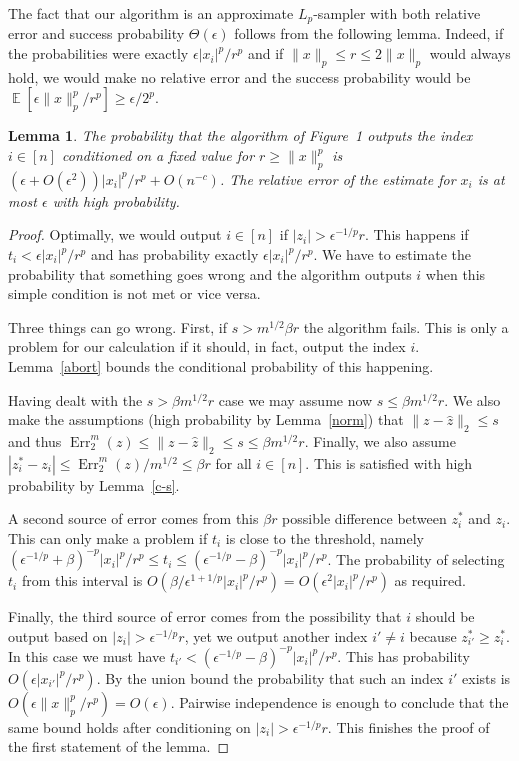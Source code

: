 \documentclass[9pt,letterpaper]{article}
\newtheorem{lemma}{Lemma}
\theoremstyle{remark}
\DeclareMathOperator*{\E}{\mathbb{E}}
\DeclareMathOperator{\err}{Err}
\begin{document}
The fact that our algorithm is an approximate $L_p$-sampler with both relative
error and success probability $\Theta(\epsilon)$ follows from the following
lemma. Indeed, if the probabilities were exactly $\epsilon|x_i|^p/r^p$ and
if $\|x\|_p\le r\le2\|x\|_p$ would always hold, we
would make no relative error and the success probability would be
$\E[\epsilon\|x\|_p^p/r^p]\ge\epsilon/2^p$.

\begin{lemma} \label{lps}
The probability that the algorithm of Figure~1 outputs the index
$i\in[n]$ conditioned on a fixed value for $r\ge\|x\|_p^p$ is
$(\epsilon+O(\epsilon^2))|x_i|^p/r^p+O(n^{-c})$. The
relative error of the estimate for $x_i$ is at most $\epsilon$ with high
probability.
\end{lemma}

\begin{proof} Optimally, we would output $i\in[n]$ if
$|z_i|>\epsilon^{-1/p}r$. This happens if $t_i<\epsilon|x_i|^p/r^p$ and
has probability exactly $\epsilon|x_i|^p/r^p$. We have to estimate the
probability that something goes wrong and the algorithm outputs $i$ when this
simple condition is not met or vice versa.

Three things can go wrong. First, if $s>m^{1/2}\beta r$ the algorithm
fails. This is only a problem for our calculation if it should, in fact,
output the index $i$. Lemma~\ref{abort} bounds the conditional
probability of this happening.

Having dealt with the $s>\beta m^{1/2}r$ case we may assume now $s\le\beta
m^{1/2} r$. We also make the assumptions (high probability by
Lemma~\ref{norm}) that
$\|z-\hat z\|_2\le s$ and thus $\err_2^m(z)\le\|z-\hat z\|_2\le s\le\beta
m^{1/2}r$. Finally, we also assume $|z^*_i-z_i|\le\err_2^m(z)/m^{1/2}\le\beta
r$ for all $i\in[n]$. This is satisfied with high probability by
Lemma~\ref{c-s}.

A second source of error comes from this $\beta r$ possible difference
between $z^*_i$ and $z_i$. This can only make a problem if $t_i$ is
close to the threshold, namely $(\epsilon^{-1/p}+\beta)^{-p}|x_i|^p/r^p\le
t_i\le (\epsilon^{-1/p}-\beta)^{-p}|x_i|^p/r^p$. The probability of selecting
$t_i$ from this interval is
$O(\beta/\epsilon^{1+1/p}|x_i|^p/r^p)=O(\epsilon^2|x_i|^p/r^p)$ as required.

Finally, the third source of error comes from the possibility that $i$ should
be output based on $|z_i|>\epsilon^{-1/p}r$, yet we output another index
$i'\ne i$ because $z^*_{i'}\ge z^*_i$. In this case we
must have $t_{i'}<(\epsilon^{-1/p}-\beta)^{-p}|x_i|^p/r^p$. This has
probability $O(\epsilon|x_{i'}|^p/r^p)$. By the union bound the probability
that such an index $i'$ exists is
$O(\epsilon\|x\|_p^p/r^p)=O(\epsilon)$. Pairwise independence is enough to
conclude that the same bound holds after conditioning on
$|z_i|>\epsilon^{-1/p}r$. This finishes the proof of the first statement of
the lemma.


\end{proof}
\end{document}
